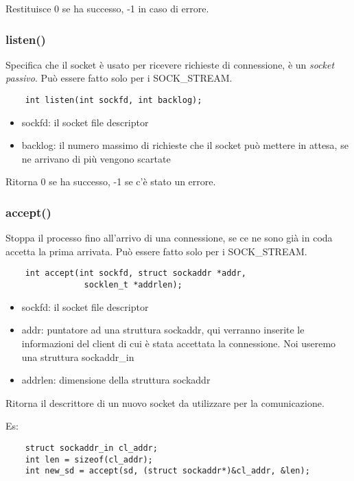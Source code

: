 Restituisce 0 se ha successo, -1 in caso di errore.

\subsubsection{listen()}
Specifica che il socket è usato per ricevere richieste di connessione, è un \emph{socket passivo}.
Può essere fatto solo per i SOCK\_STREAM.

\begin{verbatim}
    int listen(int sockfd, int backlog);
\end{verbatim}
\begin{itemize}
    \item sockfd: il socket file descriptor
    \item backlog: il numero massimo di richieste che il socket può mettere in attesa, se ne arrivano di più vengono scartate
\end{itemize}
Ritorna 0 se ha successo, -1 se c'è stato un errore.

\subsubsection{accept()}
Stoppa il processo fino all'arrivo di una connessione, se ce ne sono già in coda accetta la prima arrivata.
Può essere fatto solo per i SOCK\_STREAM.
\begin{verbatim}
    int accept(int sockfd, struct sockaddr *addr,
                socklen_t *addrlen);
\end{verbatim}
\begin{itemize}
    \item sockfd: il socket file descriptor
    \item addr: puntatore ad una struttura sockaddr, qui verranno inserite le informazioni del client di cui è stata accettata la connessione.
    Noi useremo una struttura sockaddr\_in
    \item addrlen: dimensione della struttura sockaddr
\end{itemize}
Ritorna il descrittore di un nuovo socket da utilizzare per la comunicazione.

Es:
\begin{verbatim}
    struct sockaddr_in cl_addr;
    int len = sizeof(cl_addr);
    int new_sd = accept(sd, (struct sockaddr*)&cl_addr, &len);
\end{verbatim}

